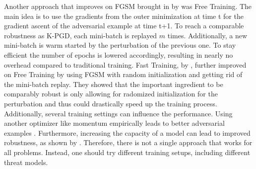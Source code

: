 \documentclass{article}
\begin{document}
Another approach that improves on FGSM brought in by \cite{b5} was Free Training. The main idea is to use the gradients from the outer minimization at time t for the gradient ascent of the adversarial example at time t+1. To reach a comparable robustness as K-PGD, each mini-batch is replayed $m$ times. Additionally, a new mini-batch is warm started by the perturbation of the previous one. To stay efficient the number of epochs is lowered accordingly, resulting in nearly no overhead compared to traditional training.
Fast Training, by \cite{b3}, further improved on Free Training by using FGSM with random initialization and getting rid of the mini-batch replay. They showed that the important ingredient to be comparably robust is only allowing for radomized initialization for the perturbation and thus could drastically speed up the training process. \\
Additionally, several training settings can influence the performance. Using another optimizer like momentum empirically leads to better adversarial examples \cite{b29}. Furthermore, increasing the capacity of a model can lead to improved robustness, as shown by \cite{b2}. Therefore, there is not a single approach that works for all problems. Instead, one should try different training setups, including different threat models.
  
\end{document}
